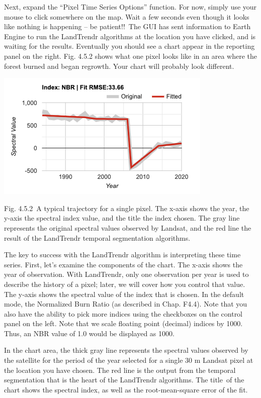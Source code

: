 \documentclass[
  letterpaper,
  DIV=11,
  numbers=noendperiod]{scrreprt}
\begin{document}
Next, expand the ``Pixel Time Series Options'' function. For now, simply
use your mouse to click somewhere on the map. Wait a few seconds even
though it looks like nothing is happening -- be patient!!~The GUI has
sent information to Earth Engine to run the LandTrendr algorithms at the
location you have clicked, and is waiting for the results. Eventually
you should see a chart appear in the reporting panel on the right. Fig.
4.5.2 shows what one pixel looks like in an area where the forest burned
and began regrowth. Your chart will probably look different.

\includegraphics{./F4/image88.png}

Fig. 4.5.2~A typical trajectory for a single pixel. The x-axis shows the
year, the y-axis the spectral index value, and the title the index
chosen. The gray line represents the original spectral values observed
by Landsat, and the red line the result of the LandTrendr temporal
segmentation algorithms.

The key to success with the LandTrendr algorithm is interpreting these
time series. First, let's examine the components of the chart. The
x-axis shows the year of observation. With LandTrendr, only one
observation per year is used to describe the history of a pixel; later,
we will cover how you control that value. The y-axis shows the spectral
value of the index that is chosen. In the default mode, the Normalized
Burn Ratio (as described in Chap. F4.4). Note that you also have the
ability to pick more indices using the checkboxes on the control panel
on the left. Note that we scale floating point (decimal) indices by
1000. Thus, an NBR value of 1.0 would be displayed as 1000.

In the chart area, the thick gray line represents the spectral values
observed by the satellite for the period of the year selected for a
single 30 m Landsat pixel at the location you have chosen. The red line
is the output from the temporal segmentation that is the heart of the
LandTrendr algorithms. The title~of the chart shows the spectral index,
as well as the root-mean-square error of the fit.~
\end{document}
